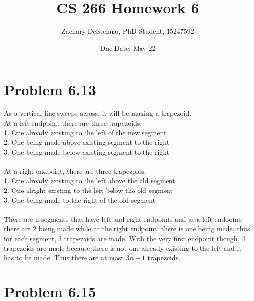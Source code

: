 \documentclass[11pt,psfig]{article}
\begin{document}
\setlength{\parskip}{1.2ex plus0.3ex minus 0.3ex}


\thispagestyle{empty} \pagestyle{myheadings} 



\title{CS 266 Homework 6}
\author{Zachary DeStefano, PhD Student, 15247592}
\date{Due Date: May 22}

\maketitle

\vfill\eject

\section*{Problem 6.13}

As a vertical line sweeps across, it will be making a trapezoid. \\
At a left endpoint, there are three trapezoids:\\
1. One already existing to the left of the new segment\\
2. One being made above existing segment to the right\\
3. One being made below existing segment to the right\\
\\
At a right endpoint, there are three trapezoids:\\
1. One already existing to the left above the old segment\\
2. One alright existing to the left below the old segment\\
3. One being made to the right of the old segment\\
\\
There are n segments that have left and right endpoints and at a left endpoint, there are 2 being made while at the right endpoint, there is one being made, thus for each segment, 3 trapezoids are made. With the very first endpoint though, 4 trapezoids are made because there is not one already existing to the left and it has to be made. Thus there are at most $3n+1$ trapezoids. 

\newpage

\section*{Problem 6.15}
\end{document}
